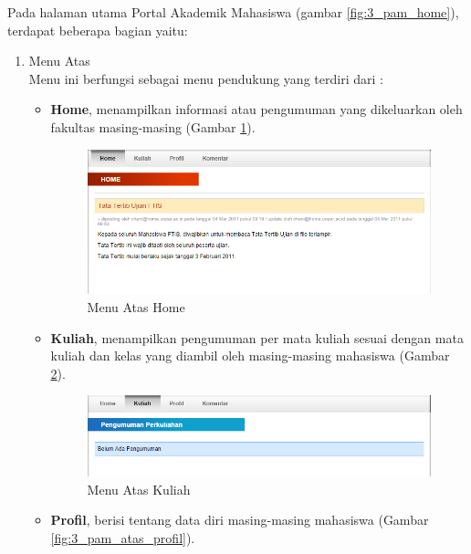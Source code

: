 Pada halaman utama Portal Akademik Mahasiswa (gambar \ref{fig:3_pam_home}), terdapat beberapa bagian yaitu:
\begin{enumerate}
	\item Menu Atas\\
	Menu ini berfungsi sebagai menu pendukung yang terdiri dari : 
	\begin{itemize}
		\item \textbf{Home}, menampilkan informasi atau pengumuman yang dikeluarkan oleh fakultas masing-masing (Gambar \ref{fig:3_pam_atas_home}). 
		
		\begin{figure}[H]
			\centering
			\includegraphics[scale=0.5]{Gambar/pam-atas-home}
			\caption{Menu Atas Home} 
			\label{fig:3_pam_atas_home}
		\end{figure}
		
		\item \textbf{Kuliah}, menampilkan pengumuman per mata kuliah sesuai dengan mata kuliah dan kelas yang diambil oleh masing-masing mahasiswa (Gambar \ref{fig:3_pam_atas_kuliah}).  
		
		\begin{figure}[H]
			\centering
			\includegraphics[scale=0.5]{Gambar/pam-atas-kuliah}
			\caption{Menu Atas Kuliah} 
			\label{fig:3_pam_atas_kuliah}
		\end{figure}
		
		\item \textbf{Profil}, berisi tentang data diri masing-masing mahasiswa (Gambar \ref{fig:3_pam_atas_profil}). 
		

\end{itemize}
\end{enumerate}
